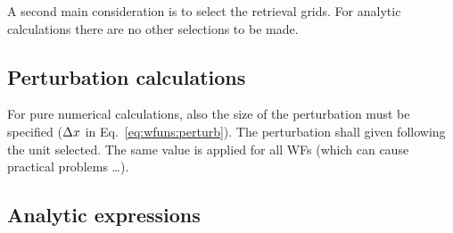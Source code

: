 A second main consideration is to select the retrieval grids. For analytic
calculations there are no other selections to be made. 


\subsection{Perturbation calculations}
%
For pure numerical calculations, also the size of the perturbation must be
specified ($\Delta x$ in Eq.~\ref{eq:wfuns:perturb}). The perturbation
shall given following the unit selected. The same value is applied for all WFs
(which can cause practical problems \dots).


\subsection{Analytic expressions}
%

